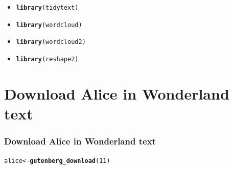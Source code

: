 \documentclass{beamer}\usepackage[]{graphicx}\usepackage[]{color}
\makeatletter
\newcommand{\hlnum}[1]{\textcolor[rgb]{0.686,0.059,0.569}{#1}}%
\newcommand{\hlstd}[1]{\textcolor[rgb]{0.345,0.345,0.345}{#1}}%
\newcommand{\hlkwb}[1]{\textcolor[rgb]{0.69,0.353,0.396}{#1}}%
\newcommand{\hlkwd}[1]{\textcolor[rgb]{0.737,0.353,0.396}{\textbf{#1}}}%
\newenvironment{kframe}{%
 \def\at@end@of@kframe{}%
 \ifinner\ifhmode%
  \def\at@end@of@kframe{\end{minipage}}%
  \begin{minipage}{\columnwidth}%
 \fi\fi%
 \def\FrameCommand##1{\hskip\@totalleftmargin \hskip-\fboxsep
 \colorbox{shadecolor}{##1}\hskip-\fboxsep
     \hskip-\linewidth \hskip-\@totalleftmargin \hskip\columnwidth}%
 \MakeFramed {\advance\hsize-\width
   \@totalleftmargin\z@ \linewidth\hsize
   \@setminipage}}%
 {\par\unskip\endMakeFramed%
 \at@end@of@kframe}
\newenvironment{knitrout}{}{} %
\makeatother
\begin{document}
\begin{frame}[fragile]
\begin{itemize}
\begin{knitrout}
\begin{kframe}
\end{kframe}
\end{knitrout}
     \item<5->  
\begin{knitrout}
\color{fgcolor}\begin{kframe}
\begin{alltt}
\hlkwd{library}\hlstd{(tidytext)}
\end{alltt}
\end{kframe}
\end{knitrout}
     \item<6->  
\begin{knitrout}
\color{fgcolor}\begin{kframe}
\begin{alltt}
\hlkwd{library}\hlstd{(wordcloud)}
\end{alltt}
\end{kframe}
\end{knitrout}
     \item<7->  
\begin{knitrout}
\color{fgcolor}\begin{kframe}
\begin{alltt}
\hlkwd{library}\hlstd{(wordcloud2)}
\end{alltt}
\end{kframe}
\end{knitrout}
     \item<8->  
\begin{knitrout}
\color{fgcolor}\begin{kframe}
\begin{alltt}
\hlkwd{library}\hlstd{(reshape2)}
\end{alltt}
\end{kframe}
\end{knitrout}
    
    \end{itemize}
\end{frame}

\section{Download Alice in Wonderland text}
\begin{frame}[fragile]
 \frametitle{Download Alice in Wonderland text}
\begin{knitrout}
\color{fgcolor}\begin{kframe}
\begin{alltt}
\hlstd{alice}\hlkwb{<-}\hlkwd{gutenberg_download}\hlstd{(}\hlnum{11}\hlstd{)}
\end{alltt}
\end{kframe}
\end{knitrout}
\end{frame}
\end{document}
